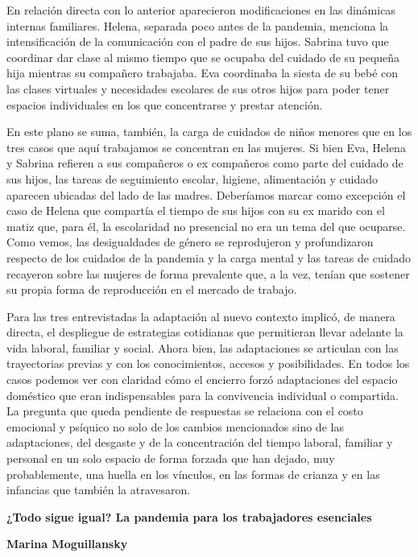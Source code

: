 En relación directa con lo anterior aparecieron modificaciones en las dinámicas internas familiares. Helena, separada poco antes de la pandemia, menciona la intensificación de la comunicación con el padre de sus hijos. Sabrina tuvo que coordinar dar clase al mismo tiempo que se ocupaba del cuidado de su pequeña hija mientras su compañero trabajaba. Eva coordinaba la siesta de su bebé con las clases virtuales y necesidades escolares de sus otros hijos para poder tener espacios individuales en los que concentrarse y prestar atención.

En este plano se suma, también, la carga de cuidados de niños menores que en los tres casos que aquí trabajamos se concentran en las mujeres. Si bien Eva, Helena y Sabrina refieren a sus compañeros o ex compañeros como parte del cuidado de sus hijos, las tareas de seguimiento escolar, higiene, alimentación y cuidado aparecen ubicadas del lado de las madres. Deberíamos marcar como excepción el caso de Helena que compartía el tiempo de sus hijos con su ex marido con el matiz que, para él, la escolaridad no presencial no era un tema del que ocuparse. Como vemos, las desigualdades de género se reprodujeron y profundizaron respecto de los cuidados de la pandemia y la carga mental y las tareas de cuidado recayeron sobre las mujeres de forma prevalente que, a la vez, tenían que sostener su propia forma de reproducción en el mercado de trabajo.

Para las tres entrevistadas la adaptación al nuevo contexto implicó, de manera directa, el despliegue de estrategias cotidianas que permitieran llevar adelante la vida laboral, familiar y social. Ahora bien, las adaptaciones se articulan con las trayectorias previas y con los conocimientos, accesos y posibilidades. En todos los casos podemos ver con claridad cómo el encierro forzó adaptaciones del espacio doméstico que eran indispensables para la convivencia individual o compartida. La pregunta que queda pendiente de respuestas se relaciona con el costo emocional y psíquico no solo de los cambios mencionados sino de las adaptaciones, del desgaste y de la concentración del tiempo laboral, familiar y personal en un solo espacio de forma forzada que han dejado, muy probablemente, una huella en los vínculos, en las formas de crianza y en las infancias que también la atravesaron.

\textbf{\hfill\break
}

\textbf{¿Todo sigue igual? La pandemia para los trabajadores esenciales}

\textbf{Marina Moguillansky}

